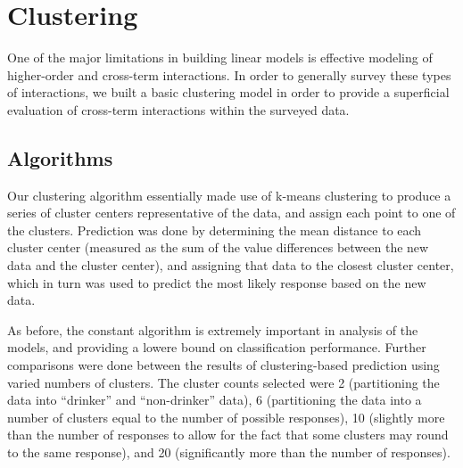 \section{Clustering}
\label{sec:clustering}

One of the major limitations in building linear models is effective modeling of higher-order and cross-term interactions.  In order to generally survey these types of interactions, we built a basic clustering model in order to provide a superficial evaluation of cross-term interactions within the surveyed data.

\subsection{Algorithms}

Our clustering algorithm essentially made use of k-means clustering to produce a series of cluster centers representative of the data, and assign each point to one of the clusters.  Prediction was done by determining the mean distance to each cluster center (measured as the sum of the value differences between the new data and the cluster center), and assigning that data to the closest cluster center, which in turn was used to predict the most likely response based on the new data.

As before, the constant algorithm is extremely important in analysis of the models, and providing a lowere bound on classification performance.  Further comparisons were done between the results of clustering-based prediction using varied numbers of clusters.  The cluster counts selected were 2 (partitioning the data into ``drinker'' and ``non-drinker'' data), 6 (partitioning the data into a number of clusters equal to the number of possible responses), 10 (slightly more than the number of responses to allow for the fact that some clusters may round to the same response), and 20 (significantly more than the number of responses).

